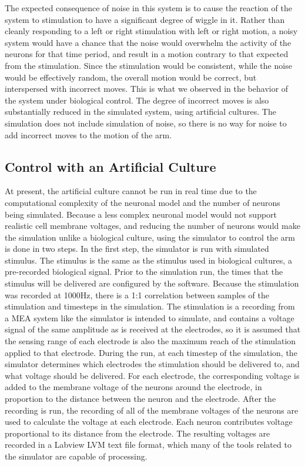 \documentclass[letterpaper]{article}
\begin{document}
The expected consequence of noise in this system is to cause the reaction of the system to stimulation to have a significant degree of wiggle in it. 
Rather than cleanly responding to a left or right stimulation with left or right motion, a noisy system would have a chance that the noise would overwhelm the activity of the neurons for that time period, and result in a motion contrary to that expected from the stimulation. Since the stimulation would be consistent, while the noise would be effectively random, the overall motion would be correct, but interspersed with incorrect moves. 
This is what we observed in the behavior of the system under biological control.
The degree of incorrect moves is also substantially reduced in the simulated system, using artificial cultures. 
The simulation does not include simulation of noise, so there is no way for noise to add incorrect moves to the motion of the arm. 

\subsection{Control with an Artificial Culture}

At present, the artificial culture cannot be run in real time due to the computational complexity of the neuronal model and the number of neurons being simulated. 
Because a less complex neuronal model would not support realistic cell membrane voltages, and reducing the number of neurons would make the simulation unlike a biological culture, using the simulator to control the arm is done in two steps. 
In the first step, the simulator is run with simulated stimulus. 
The stimulus is the same as the stimulus used in biological cultures, a pre-recorded biological signal. 
Prior to the simulation run, the times that the stimulus will be delivered are configured by the software. 
Because the stimulation was recorded at 1000Hz, there is a 1:1 correlation between samples of the stimulation and timesteps in the simulation. 
The stimulation is a recording from a MEA system like the simulator is intended to simulate, and contains a voltage signal of the same amplitude as is received at the electrodes, so it is assumed that the sensing range of each electrode is also the maximum reach of the stimulation applied to that electrode. 
During the run, at each timestep of the simulation, the simulator determines which electrodes the stimulation should be delivered to, and what voltage should be delivered.
For each electrode, the corresponding voltage is added to the membrane voltage of the neurons around the electrode, in proportion to the distance between the neuron and the electrode. 
After the recording is run, the recording of all of the membrane voltages of the neurons are used to calculate the voltage at each electrode. 
Each neuron contributes voltage proportional to its distance from the electrode. 
The resulting voltages are recorded in a Labview LVM text file format, which many of the tools related to the simulator are capable of processing. 
\end{document}
